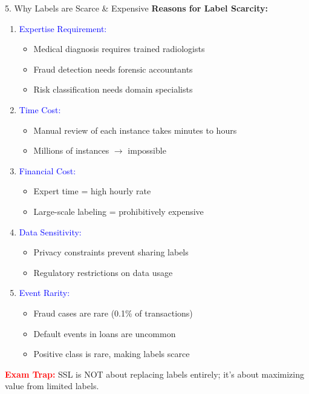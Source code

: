 \documentclass[8pt]{beamer}
\begin{document}
	\begin{frame}{5. Why Labels are Scarce \& Expensive}
		\fontsize{6.5}{7.5}\selectfont
		\textbf{Reasons for Label Scarcity:}
		
		\begin{enumerate}
			\item \textcolor{blue}{Expertise Requirement:}
			\begin{itemize}
				\item Medical diagnosis requires trained radiologists
				\item Fraud detection needs forensic accountants
				\item Risk classification needs domain specialists
			\end{itemize}
			
			\item \textcolor{blue}{Time Cost:}
			\begin{itemize}
				\item Manual review of each instance takes minutes to hours
				\item Millions of instances $\rightarrow$ impossible
			\end{itemize}
			
			\item \textcolor{blue}{Financial Cost:}
			\begin{itemize}
				\item Expert time = high hourly rate
				\item Large-scale labeling = prohibitively expensive
			\end{itemize}
			
			\item \textcolor{blue}{Data Sensitivity:}
			\begin{itemize}
				\item Privacy constraints prevent sharing labels
				\item Regulatory restrictions on data usage
			\end{itemize}
			
			\item \textcolor{blue}{Event Rarity:}
			\begin{itemize}
				\item Fraud cases are rare (0.1\% of transactions)
				\item Default events in loans are uncommon
				\item Positive class is rare, making labels scarce
			\end{itemize}
		\end{enumerate}
		
		\textcolor{red}{\textbf{Exam Trap:}} SSL is NOT about replacing labels entirely; it's about maximizing value from limited labels.
	\end{frame}
	
\end{document}
